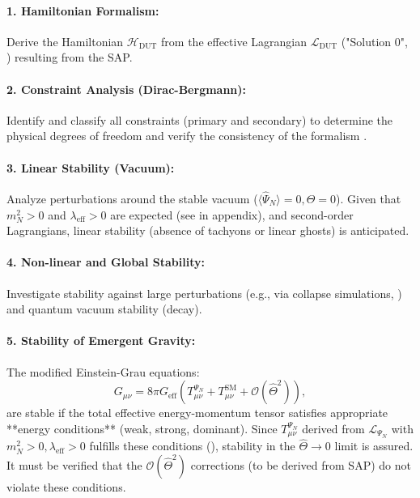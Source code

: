 \documentclass[11pt, a4paper]{article}
\theoremstyle{remark}
\newcommand{\Op}[1]{\hat{#1}}
\begin{document}
\paragraph{1. Hamiltonian Formalism:} Derive the Hamiltonian \( \mathcal{H}_{\text{DUT}} \) from the effective Lagrangian \( \mathcal{L}_{\text{DUT}} \) ("Solution 0", ) resulting from the SAP.

\paragraph{2. Constraint Analysis (Dirac-Bergmann):} Identify and classify all constraints (primary and secondary) to determine the physical degrees of freedom and verify the consistency of the formalism \citep{HenneauxTeitelboim1992}.

\paragraph{3. Linear Stability (Vacuum):} Analyze perturbations around the stable vacuum (\( \langle \Op{\Psi}_N \rangle = 0, \Theta = 0 \)). Given that \( m_N^2 > 0 \) and \( \lambda_{\text{eff}} > 0 \) are expected (see  in appendix), and second-order Lagrangians, linear stability (absence of tachyons or linear ghosts) is anticipated.

\paragraph{4. Non-linear and Global Stability:} Investigate stability against large perturbations (e.g., via collapse simulations, ) and quantum vacuum stability (decay).

\paragraph{5. Stability of Emergent Gravity:} The modified Einstein-Grau equations:
\[
G_{\mu\nu} = 8\pi G_{\text{eff}} \left( T_{\mu\nu}^{\Psi_N} + T_{\mu\nu}^{\text{SM}} + \mathcal{O}(\Op{\Theta}^2) \right),
\]
are stable if the total effective energy-momentum tensor satisfies appropriate **energy conditions** (weak, strong, dominant). Since \( T_{\mu\nu}^{\Psi_N} \) derived from \( \mathcal{L}_{\Psi_N} \) with \(m_N^2>0, \lambda_{\text{eff}}>0\) fulfills these conditions (), stability in the \( \Op{\Theta} \to 0 \) limit is assured. It must be verified that the \( \mathcal{O}(\Op{\Theta}^2) \) corrections (to be derived from SAP) do not violate these conditions.
\end{document}
